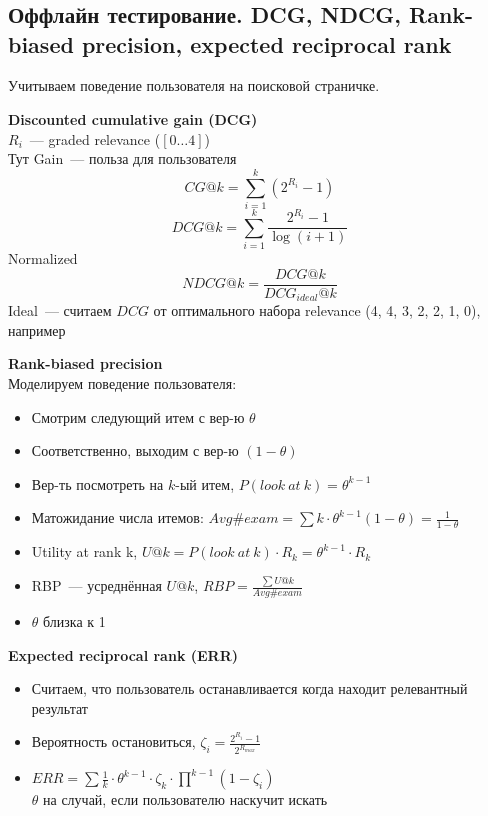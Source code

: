 \documentclass[12pt]{article}
\begin{document}
\pagebreak %

\section{} %

  \subsection{Оффлайн тестирование. DCG, NDCG, Rank-biased precision, expected reciprocal rank}
  Учитываем поведение пользователя на поисковой страничке.

  \smallskip
  {\bf Discounted cumulative gain (DCG)}\\
  $R_i$~--- graded relevance ($[0 \dots 4]$)\\
  Тут Gain~--- польза для пользователя
  $$CG@k = \sum\limits_{i = 1}^k (2^{R_i} - 1)$$
  $$DCG@k = \sum\limits_{i = 1}^k \frac{2^{R_i} - 1}{\log (i + 1)}$$
  Normalized
  $$NDCG@k = \frac{DCG@k}{DCG_{ideal}@k}$$
  Ideal~--- считаем $DCG$ от оптимального набора relevance (4, 4, 3, 2, 2, 1, 0), например

  \smallskip
  {\bf Rank-biased precision}\\
  Моделируем поведение пользователя:
  \begin{itemize}
    \item Смотрим следующий итем с вер-ю $\theta$
    \item Соответственно, выходим с вер-ю $(1 - \theta)$ 
    \item Вер-ть посмотреть на $k$-ый итем, $P(look~at~k) = \theta^{k - 1}$
    \item Матожидание числа итемов: $Avg\#exam = \sum k \cdot \theta^{k - 1} (1 - \theta) = \frac{1}{1 - \theta}$
    \item Utility at rank k, $U@k = P(look~at~k) \cdot R_k = \theta^{k - 1} \cdot R_k$
    \item RBP~--- усреднённая $U@k$, $RBP = \frac{\sum U@k}{Avg\#exam}$
    \item $\theta$ близка к 1
  \end{itemize}

  \smallskip
  {\bf Expected reciprocal rank (ERR)}
  \begin{itemize}
    \item Считаем, что пользователь останавливается когда находит релевантный результат
    \item Вероятность остановиться, $\zeta_i = \frac{2^{R_i} - 1}{2^{R_{max}}}$
    \item $ERR = \sum \frac{1}{k} \cdot \theta^{k - 1} \cdot \zeta_k \cdot \prod^{k - 1} (1 - \zeta_i)$\\
    $\theta$ на случай, если пользователю наскучит искать

  \end{itemize}
  \pagebreak
\end{document}
